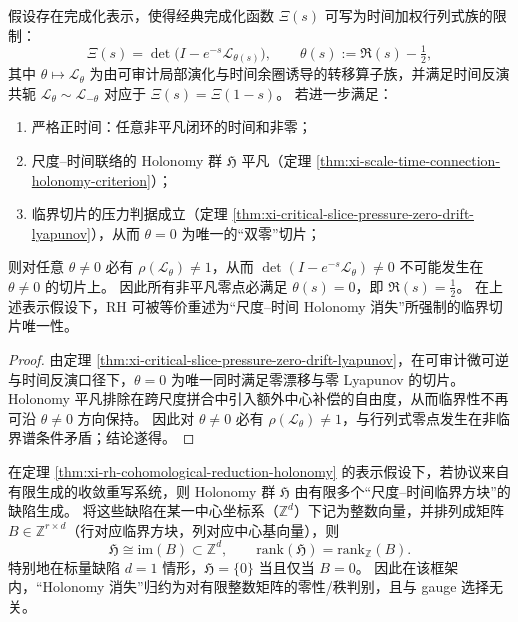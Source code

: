 \begin{theorem}\label{thm:xi-rh-cohomological-reduction-holonomy}
假设存在完成化表示，使得经典完成化函数 \(\Xi(s)\) 可写为时间加权行列式族的限制：
\[
\Xi(s)=\det\!\bigl(I-e^{-s}\mathcal L_{\theta(s)}\bigr),
\qquad
\theta(s):=\Re(s)-\tfrac12,
\]
其中 \(\theta\mapsto\mathcal L_{\theta}\) 为由可审计局部演化与时间余圈诱导的转移算子族，并满足时间反演共轭
\(
\mathcal L_{\theta}\sim \mathcal L_{-\theta}
\)
对应于 \(\Xi(s)=\Xi(1-s)\)。
若进一步满足：
\begin{enumerate}
  \item 严格正时间：任意非平凡闭环的时间和非零；
  \item 尺度--时间联络的 Holonomy 群 \(\mathfrak H\) 平凡（定理 \ref{thm:xi-scale-time-connection-holonomy-criterion}）；
  \item 临界切片的压力判据成立（定理 \ref{thm:xi-critical-slice-pressure-zero-drift-lyapunov}），从而 \(\theta=0\) 为唯一的“双零”切片；
\end{enumerate}
则对任意 \(\theta\neq 0\) 必有 \(\rho(\mathcal L_{\theta})\neq 1\)，从而 \(\det(I-e^{-s}\mathcal L_{\theta})\neq 0\) 不可能发生在 \(\theta\neq 0\) 的切片上。
因此所有非平凡零点必满足 \(\theta(s)=0\)，即 \(\Re(s)=\tfrac12\)。
在上述表示假设下，RH 可被等价重述为“尺度--时间 Holonomy 消失”所强制的临界切片唯一性。
\end{theorem}

\begin{proof}
由定理 \ref{thm:xi-critical-slice-pressure-zero-drift-lyapunov}，在可审计微可逆与时间反演口径下，\(\theta=0\) 为唯一同时满足零漂移与零 Lyapunov 的切片。
Holonomy 平凡排除在跨尺度拼合中引入额外中心补偿的自由度，从而临界性不再可沿 \(\theta\neq 0\) 方向保持。
因此对 \(\theta\neq 0\) 必有 \(\rho(\mathcal L_{\theta})\neq 1\)，与行列式零点发生在非临界谱条件矛盾；结论遂得。
\end{proof}

\begin{proposition}\label{prop:xi-rh-finite-curvature-matrix-criterion}
在定理 \ref{thm:xi-rh-cohomological-reduction-holonomy} 的表示假设下，若协议来自有限生成的收敛重写系统，则 Holonomy 群 \(\mathfrak H\) 由有限多个“尺度--时间临界方块”的缺陷生成。
将这些缺陷在某一中心坐标系（\(\mathbb Z^d\)）下记为整数向量，并排列成矩阵 \(B\in\mathbb Z^{r\times d}\)（行对应临界方块，列对应中心基向量），则
\[
\mathfrak H\cong \mathrm{im}(B)\subset\mathbb Z^d,
\qquad
\mathrm{rank}(\mathfrak H)=\mathrm{rank}_{\mathbb Z}(B).
\]
特别地在标量缺陷 \(d=1\) 情形，\(\mathfrak H=\{0\}\) 当且仅当 \(B=0\)。
因此在该框架内，“Holonomy 消失”归约为对有限整数矩阵的零性/秩判别，且与 gauge 选择无关。
\end{proposition}

